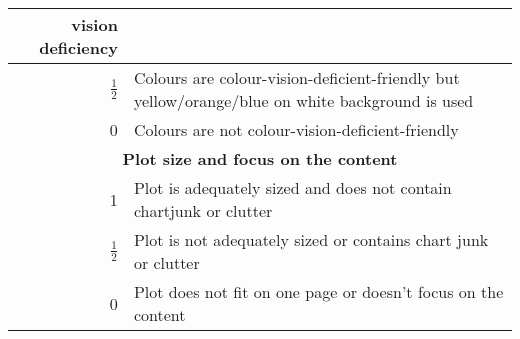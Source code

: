\documentclass{article}
\begin{document}
\begin{tabular}{@{}|r|p{6.5in}|@{}}
  vision deficiency
  \\
  \hline $\frac{1}{2}$ 
  & Colours are colour-vision-deficient-friendly but
  yellow/orange/blue on white background is used
  \\
  \hline
  0 
  &  Colours are not colour-vision-deficient-friendly
  \\
  \hline
  \multicolumn{2}{c}{\textbf{Plot size and focus on the content}}
  \\
  \hline
  1 
  & Plot is adequately sized and does not contain chartjunk or clutter
  \\
  \hline $\frac{1}{2}$ 
  &Plot is not adequately sized or contains chart junk or clutter
  \\
  \hline0 
  &Plot does not fit on one page or doesn't focus on the content
  \\
  \hline
\end{tabular}
\end{document}
